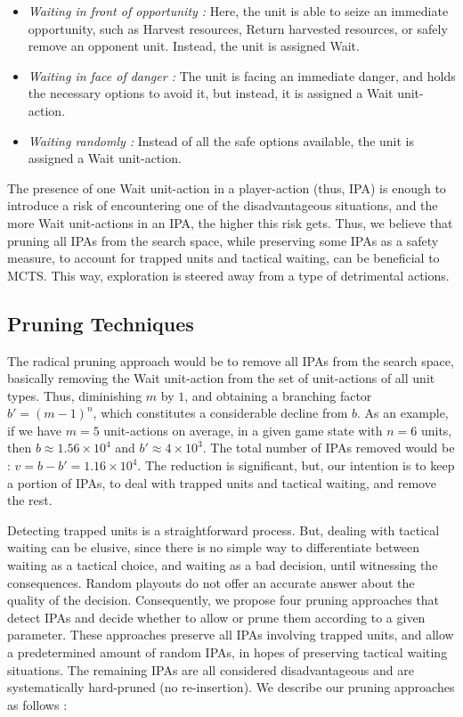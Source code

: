 \documentclass[conference]{IEEEtran}
\begin{document}
\begin{itemize}
\item \textit{Waiting in front of opportunity :} Here, the unit is able to seize an immediate opportunity, such as Harvest resources, Return harvested resources, or safely remove an opponent unit. Instead, the unit is assigned Wait.
\item \textit{Waiting in face of danger :} The unit is facing an immediate danger, and holds the necessary options to avoid it, but instead, it is assigned a Wait unit-action.
\item \textit{Waiting randomly :} Instead of all the safe options available, the unit is assigned a Wait unit-action.
\end{itemize}

The presence of one Wait unit-action in a player-action (thus, IPA) is enough to introduce a risk of encountering one of the disadvantageous situations, and the more Wait unit-actions in an IPA, the higher this risk gets. Thus, we believe that pruning all IPAs from the search space, while preserving some IPAs as a safety measure, to account for trapped units and tactical waiting, can be beneficial to MCTS. This way, exploration is steered away from a type of detrimental actions.


\subsection{Pruning Techniques}

The radical pruning approach would be to remove all IPAs from the search space, basically removing the Wait unit-action from the set of unit-actions of all unit types. Thus, diminishing $m$ by $1$, and obtaining a branching factor $b' = (m - 1)^n$, which constitutes a considerable decline from $b$. As an example, if we have $m=5$ unit-actions on average, in a given game state with $n=6$ units, then $b \approx 1.56\times10^4$ and $b' \approx 4\times10^3$. The total number of IPAs removed would be : $v = b - b' = 1.16\times10^4$. The reduction is significant, but, our intention is to keep a portion of IPAs, to deal with trapped units and tactical waiting, and remove the rest.

Detecting trapped units is a straightforward process. But, dealing with tactical waiting can be elusive, since there is no simple way to differentiate between waiting as a tactical choice, and waiting as a bad decision, until witnessing the consequences. Random playouts do not offer an accurate answer about the quality of the decision. Consequently, we propose four pruning approaches that detect IPAs and decide whether to allow or prune them according to a given parameter. These approaches preserve all IPAs involving trapped units, and allow a predetermined amount of random IPAs, in hopes of preserving tactical waiting situations. The remaining IPAs are all considered disadvantageous and are systematically hard-pruned (no re-insertion). We describe our pruning approaches as follows :
\end{document}
